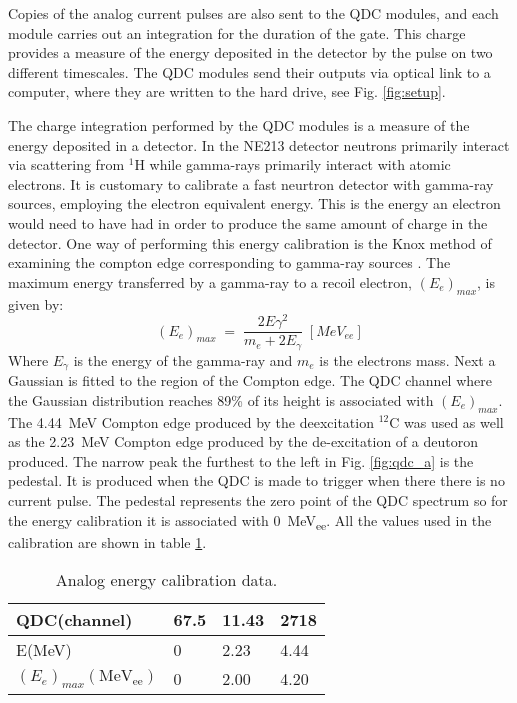 \documentclass[main.tex]{subfiles}
\begin{document}
Copies of the analog current pulses are also sent to the QDC modules, and each module carries out an integration for the duration of the gate. This charge provides a measure of the energy deposited in the detector by the pulse on two different timescales. The QDC modules send their outputs via optical link to a computer, where they are written to the hard drive, see Fig. \ref{fig:setup}.

The charge integration performed by the QDC modules is a measure of the energy deposited in a detector. In the NE213 detector neutrons primarily interact via scattering from $^1$H while gamma-rays primarily interact with atomic electrons. It is customary to calibrate a fast neurtron detector with gamma-ray sources, employing the electron equivalent energy. This is the energy an electron would need to have had in order to produce the same amount of charge in the detector. One way of performing this energy calibration is the Knox method of examining the compton edge corresponding to gamma-ray sources \cite{Nilsson}. The maximum energy transferred by a gamma-ray to a recoil electron, $(E_e)_{max}$, is given by:
\begin{equation}
	(E_{e})_{max}\;=\;\frac{2E\gamma^2}{m_e + 2E_\gamma} \;[MeV_{ee}]
\end{equation}
Where $E_\gamma$ is the energy of the gamma-ray and $m_e$ is the electrons mass.
Next a Gaussian is fitted to the region of the Compton edge. The QDC channel where the Gaussian distribution reaches 89\% of its height is associated with $(E_e)_{max}$. The \SI{4.44}{MeV} Compton edge produced by the deexcitation $^{12}$C was used as well as the \SI{2.23}{MeV} Compton edge produced by the de-excitation of a deutoron produced.
 The narrow peak the furthest to the left in Fig. \ref{fig:qdc_a} is the pedestal. It is produced when the QDC is made to trigger when there there is no current pulse. The pedestal represents the zero point of the QDC spectrum so for the energy calibration it is associated with \SI{0}{MeV_{ee}}. All the values used in the calibration are shown in table \ref{tab:knox_a}.

\begin{table}[hb]
	\center
	\begin{tabular}{|l|l|l|l|}
	\hline
	QDC(channel)             & 67.5 & 11.43 & 2718 \\
	\hline
	E(MeV)          & 0    & 2.23  & 4.44 \\
	\hline
	$(E_{e})_{max}(\textrm{MeV}_\textrm{{ee}})$ & 0    & 2.00  & 4.20 \\
	\hline
	\end{tabular}
   	\captionsetup{width=0.435\linewidth}
	\caption[Analog energy calibration data.]{Analog energy calibration data.}
	\label{tab:knox_a}
\end{table}
\end{document}

